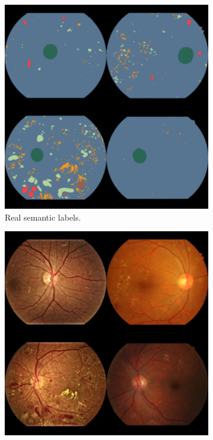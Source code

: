 \begin{figure}[h]
    \centering
    \begin{subfigure}{0.3\textwidth}
        \centering
        \includegraphics[width=\linewidth]{retinas/figs/spade_good_sample_labels.pdf}
        \caption{Real semantic labels.}
        \label{fig:spade_label_sample}
    \end{subfigure}
    \begin{subfigure}{0.3\textwidth}
        \centering
        \includegraphics[width=\linewidth]{retinas/figs/spade_good_sample_images.pdf}

\end{subfigure}
\end{figure}
